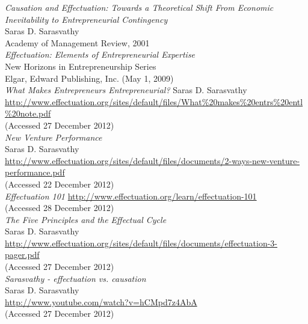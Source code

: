 \documentclass[a4paper,10pt]{book}
\begin{document}
\begin{thebibliography}{9}
  
    
  \emph{Causation and Effectuation: Towards a Theoretical Shift From Economic Inevitability to Entrepreneurial Contingency}\\
  Saras D. Sarasvathy\\
  Academy of Management Review, 2001\\

  \emph{Effectuation: Elements of Entrepreneurial Expertise}\\
   New Horizons in Entrepreneurship Series\\
   Elgar, Edward Publishing, Inc. (May 1, 2009)\\

  \emph{What Makes Entrepreneurs Entrepreneurial?} 
  Saras D. Sarasvathy\\
  \url{http://www.effectuation.org/sites/default/files/What\%20makes\%20entrs\%20entl\%20note.pdf}\\
  (Accessed 27 December 2012)\\
  
  \emph{New Venture Performance}\\
  Saras D. Sarasvathy\\
  \url{http://www.effectuation.org/sites/default/files/documents/2-ways-new-venture-performance.pdf}\\
  (Accessed 22 December 2012)\\
  
  \emph{Effectuation 101}
  \url{http://www.effectuation.org/learn/effectuation-101}\\
  (Accessed 28 December 2012)\\

  \emph{The Five Principles and the Effectual Cycle}\\
  Saras D. Sarasvathy\\
  \url{http://www.effectuation.org/sites/default/files/documents/effectuation-3-pager.pdf}\\
  (Accessed 27 December 2012)\\
  
  \emph{Sarasvathy - effectuation vs. causation}\\
  Saras D. Sarasvathy\\
  \url{http://www.youtube.com/watch?v=hCMpd7z4AbA}\\
  (Accessed 27 December 2012)\\
 

\end{thebibliography}
\end{document}
